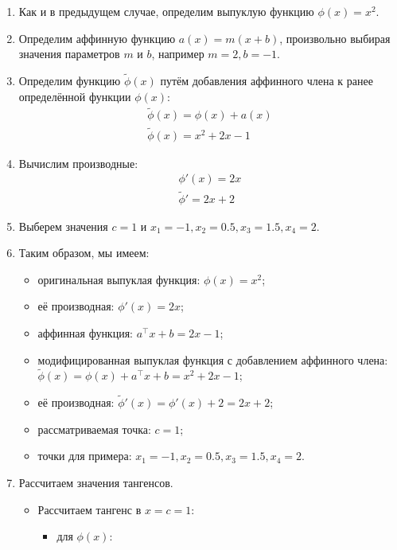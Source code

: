 \documentclass[12pt]{scrartcl}
\begin{document}
\begin{enumerate}
    \item Как и в предыдущем случае, определим выпуклую функцию $\phi(x) = x^{2}$.
    \item Определим аффинную функцию $a(x) = m(x + b)$, произвольно выбирая значения параметров $m$ и $b$, например $m = 2, b = -1$.
    \item Определим функцию $\tilde{\phi}(x)$ путём добавления аффинного члена к ранее определённой функции $\phi(x)$:
    \begin{align*}
        \tilde{\phi}(x) = \phi(x) + a(x) \\
        \tilde{\phi}(x) = x^{2} + 2x - 1
    \end{align*}
    \item Вычислим производные:
    \begin{align*}
        \phi'(x) = 2x\\
        \tilde{\phi}' = 2x + 2
    \end{align*}
    \item Выберем значения $c = 1$ и $x_{1} = -1, x_{2} = 0.5, x_{3} = 1.5, x_{4} = 2$.
    \item Таким образом, мы имеем:
    \begin{itemize}
        \item оригинальная выпуклая функция: $\phi (x) = x ^{2}$;
        \item её производная: $\phi ' (x) = 2x$;
        \item аффинная функция: $a^\top x + b = 2x -1$;
        \item модифицированная выпуклая функция с добавлением аффинного члена: $\tilde{\phi}(x) = \phi(x) + a^\top x + b = x^{2} +2x -1$;
        \item её производная: $\tilde{\phi}'(x) = \phi ' (x) + 2 = 2x + 2 $;
        \item рассматриваемая точка: $c = 1$;
        \item точки для примера: $x_{1} = -1, x_{2} = 0.5, x_{3} = 1.5, x_{4} = 2$.
    \end{itemize}
    \item Рассчитаем значения тангенсов.
    \begin{itemize}
        \item Рассчитаем тангенс в $x = c = 1$:
        \begin{itemize}
            \item для $\phi(x)$:
            \begin{align*}

\end{align*}
\end{itemize}
\end{itemize}
\end{enumerate}
\end{document}
